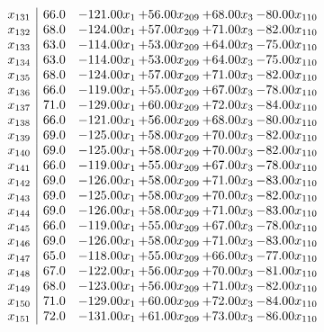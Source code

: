 \documentclass[8pt]{article}
\begin{document}
\[\begin{array}{c| c c@{\hskip 2pt} c@{\hskip 2pt} c@{\hskip 2pt} c@{\hskip 2pt} }
 x_{131}   &  66.0 & -121.00 x_{1} & + 56.00 x_{209} & + 68.00 x_{3} & -80.00 x_{110}\\
 x_{132}   &  68.0 & -124.00 x_{1} & + 57.00 x_{209} & + 71.00 x_{3} & -82.00 x_{110}\\
 x_{133}   &  63.0 & -114.00 x_{1} & + 53.00 x_{209} & + 64.00 x_{3} & -75.00 x_{110}\\
 x_{134}   &  63.0 & -114.00 x_{1} & + 53.00 x_{209} & + 64.00 x_{3} & -75.00 x_{110}\\
 x_{135}   &  68.0 & -124.00 x_{1} & + 57.00 x_{209} & + 71.00 x_{3} & -82.00 x_{110}\\
 x_{136}   &  66.0 & -119.00 x_{1} & + 55.00 x_{209} & + 67.00 x_{3} & -78.00 x_{110}\\
 x_{137}   &  71.0 & -129.00 x_{1} & + 60.00 x_{209} & + 72.00 x_{3} & -84.00 x_{110}\\
 x_{138}   &  66.0 & -121.00 x_{1} & + 56.00 x_{209} & + 68.00 x_{3} & -80.00 x_{110}\\
 x_{139}   &  69.0 & -125.00 x_{1} & + 58.00 x_{209} & + 70.00 x_{3} & -82.00 x_{110}\\
 x_{140}   &  69.0 & -125.00 x_{1} & + 58.00 x_{209} & + 70.00 x_{3} & -82.00 x_{110}\\
 x_{141}   &  66.0 & -119.00 x_{1} & + 55.00 x_{209} & + 67.00 x_{3} & -78.00 x_{110}\\
 x_{142}   &  69.0 & -126.00 x_{1} & + 58.00 x_{209} & + 71.00 x_{3} & -83.00 x_{110}\\
 x_{143}   &  69.0 & -125.00 x_{1} & + 58.00 x_{209} & + 70.00 x_{3} & -82.00 x_{110}\\
 x_{144}   &  69.0 & -126.00 x_{1} & + 58.00 x_{209} & + 71.00 x_{3} & -83.00 x_{110}\\
 x_{145}   &  66.0 & -119.00 x_{1} & + 55.00 x_{209} & + 67.00 x_{3} & -78.00 x_{110}\\
 x_{146}   &  69.0 & -126.00 x_{1} & + 58.00 x_{209} & + 71.00 x_{3} & -83.00 x_{110}\\
 x_{147}   &  65.0 & -118.00 x_{1} & + 55.00 x_{209} & + 66.00 x_{3} & -77.00 x_{110}\\
 x_{148}   &  67.0 & -122.00 x_{1} & + 56.00 x_{209} & + 70.00 x_{3} & -81.00 x_{110}\\
 x_{149}   &  68.0 & -123.00 x_{1} & + 56.00 x_{209} & + 71.00 x_{3} & -82.00 x_{110}\\
 x_{150}   &  71.0 & -129.00 x_{1} & + 60.00 x_{209} & + 72.00 x_{3} & -84.00 x_{110}\\
 x_{151}   &  72.0 & -131.00 x_{1} & + 61.00 x_{209} & + 73.00 x_{3} & -86.00 x_{110}\\

\end{array}\]
\end{document}
